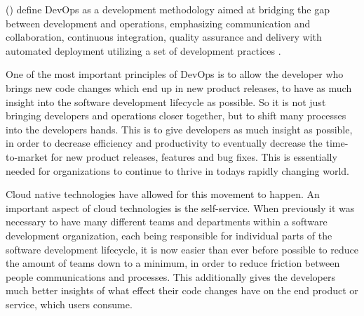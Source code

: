 \citeauthor{devopsDefinition2016} (\citeyear{devopsDefinition2016})
define DevOps as
a development methodology aimed at bridging the gap between
development and operations, emphasizing communication and collaboration,
continuous integration, quality assurance and delivery with automated deployment
utilizing a set of development practices
\autocite{devopsDefinition2016}.

One of the most important principles of DevOps is
to allow the developer who brings new code changes
which end up in new product releases,
to have as much insight into the software development lifecycle as possible.
So it is not just bringing developers and operations closer together,
but to shift many processes into the developers hands.
This is to give developers as much insight as possible,
in order to decrease efficiency and productivity to eventually
decrease the time-to-market for new product releases, features and bug fixes.
This is essentially needed for organizations to continue to thrive in todays
rapidly changing world.

Cloud native technologies have allowed for this movement to happen.
An important aspect of cloud technologies is the self-service.
When previously it was necessary to have many different teams and departments
within a software development organization,
each being responsible for individual parts of the 
software development lifecycle,
it is now easier than ever before possible to reduce the amount of
teams down to a minimum, in order to reduce friction between people communications and processes.
This additionally gives the developers much better insights of what effect their code changes have
on the end product or service, which users consume.


